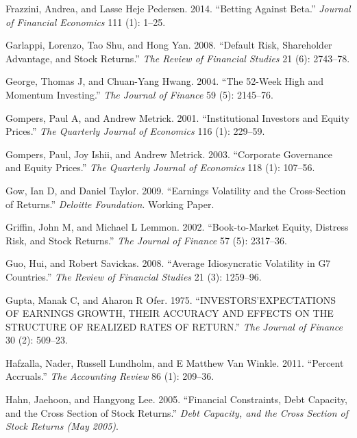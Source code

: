 \documentclass[
  letterpaper,
  DIV=11,
  numbers=noendperiod]{scrreprt}
\newlength{\cslhangindent}
\newlength{\cslentryspacingunit} %
\newenvironment{CSLReferences}[2] %
 {%
  \setlength{\parindent}{0pt}
  \ifodd #1
  \let\oldpar\par
  \def\par{\hangindent=\cslhangindent\oldpar}
  \fi
  \setlength{\parskip}{#2\cslentryspacingunit}
 }%
 {}
\begin{document}
\begin{CSLReferences}{1}{0}
\leavevmode{}%
Frazzini, Andrea, and Lasse Heje Pedersen. 2014. {``Betting Against
Beta.''} \emph{Journal of Financial Economics} 111 (1): 1--25.

\leavevmode{}%
Garlappi, Lorenzo, Tao Shu, and Hong Yan. 2008. {``Default Risk,
Shareholder Advantage, and Stock Returns.''} \emph{The Review of
Financial Studies} 21 (6): 2743--78.

\leavevmode{}%
George, Thomas J, and Chuan-Yang Hwang. 2004. {``The 52-Week High and
Momentum Investing.''} \emph{The Journal of Finance} 59 (5): 2145--76.

\leavevmode{}%
Gompers, Paul A, and Andrew Metrick. 2001. {``Institutional Investors
and Equity Prices.''} \emph{The Quarterly Journal of Economics} 116 (1):
229--59.

\leavevmode{}%
Gompers, Paul, Joy Ishii, and Andrew Metrick. 2003. {``Corporate
Governance and Equity Prices.''} \emph{The Quarterly Journal of
Economics} 118 (1): 107--56.

\leavevmode{}%
Gow, Ian D, and Daniel Taylor. 2009. {``Earnings Volatility and the
Cross-Section of Returns.''} \emph{Deloitte Foundation}. Working Paper.

\leavevmode{}%
Griffin, John M, and Michael L Lemmon. 2002. {``Book-to-Market Equity,
Distress Risk, and Stock Returns.''} \emph{The Journal of Finance} 57
(5): 2317--36.

\leavevmode{}%
Guo, Hui, and Robert Savickas. 2008. {``Average Idiosyncratic Volatility
in G7 Countries.''} \emph{The Review of Financial Studies} 21 (3):
1259--96.

\leavevmode{}%
Gupta, Manak C, and Aharon R Ofer. 1975. {``INVESTORS'EXPECTATIONS OF
EARNINGS GROWTH, THEIR ACCURACY AND EFFECTS ON THE STRUCTURE OF REALIZED
RATES OF RETURN.''} \emph{The Journal of Finance} 30 (2): 509--23.

\leavevmode{}%
Hafzalla, Nader, Russell Lundholm, and E Matthew Van Winkle. 2011.
{``Percent Accruals.''} \emph{The Accounting Review} 86 (1): 209--36.

\leavevmode{}%
Hahn, Jaehoon, and Hangyong Lee. 2005. {``Financial Constraints, Debt
Capacity, and the Cross Section of Stock Returns.''} \emph{Debt
Capacity, and the Cross Section of Stock Returns (May 2005)}.


\end{CSLReferences}
\end{document}
